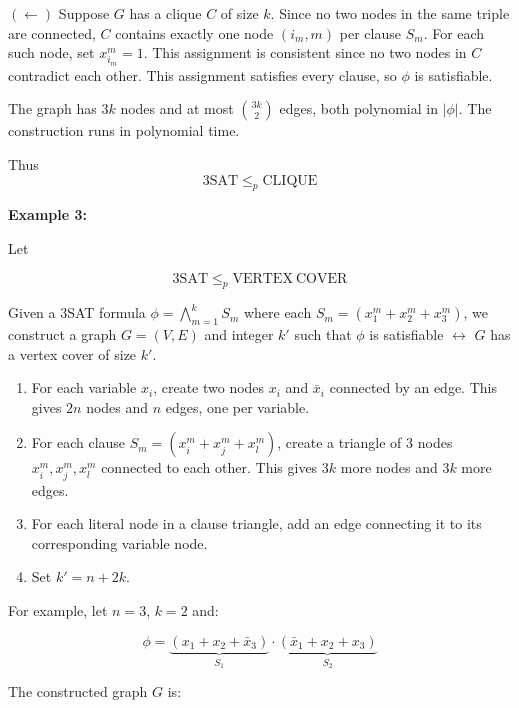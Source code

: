 \documentclass[12pt,a4paper,openany]{article}
\begin{document}
$(\leftarrow)$ Suppose $G$ has a clique $C$ of size $k$. Since no two nodes in the same triple
are connected, $C$ contains exactly one node $(i_m, m)$ per clause $S_m$. For each such node,
set $x_{i_m}^m = 1$. This assignment is consistent since no two nodes in $C$ contradict each other.
This assignment satisfies every clause, so $\phi$ is satisfiable.

The graph has $3k$ nodes and at most $\binom{3k}{2}$ edges,
both polynomial in $|\phi|$. The construction runs in polynomial time.

Thus \[\mathrm{3SAT} \leq_p \mathrm{CLIQUE}\]

\textbf{Example 3:}

Let

\[\mathrm{3SAT} \leq_p \mathrm{VERTEX\ COVER}\]

Given a 3SAT formula $\phi = \displaystyle\bigwedge_{m=1}^{k} S_m$ where each $S_m = (x_1^m + x_2^m + x_3^m)$,
we construct a graph $G = (V, E)$ and integer $k'$ such that $\phi$ is satisfiable $\leftrightarrow$ $G$ has a vertex cover of size $k'$.

\begin{enumerate}
    \item For each variable $x_i$, create two nodes $x_i$ and $\bar{x}_i$ connected by an edge. This gives $2n$ nodes and $n$ edges, one per variable.
    \item For each clause $S_m = (x_i^m + x_j^m + x_l^m)$, create a triangle of 3 nodes $x_i^m, x_j^m, x_l^m$ connected to each other. This gives $3k$ more nodes and $3k$ more edges.
    \item For each literal node in a clause triangle, add an edge connecting it to its corresponding variable node. 
    \item Set $k' = n + 2k$.
\end{enumerate}

\noindent For example, let $n = 3$, $k = 2$ and:

\[
\phi = \underbrace{(x_1 + x_2 + \bar{x}_3)}_{S_1} \cdot \underbrace{(\bar{x}_1 + x_2 + x_3)}_{S_2}
\]

The constructed graph $G$ is:
\end{document}

